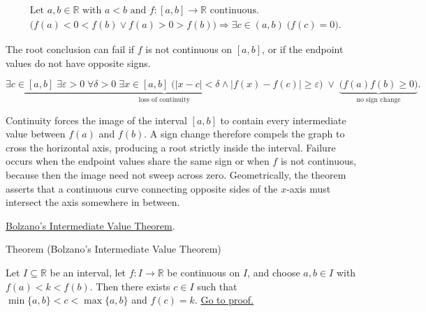 \begin{remark*}
\[
\begin{aligned}
&\text{Let } a,b \in \mathbb{R} \text{ with } a<b \text{ and } f:[a,b]\to\mathbb{R} \text{ continuous.}\\
&\bigl(f(a)<0<f(b) \lor f(a)>0>f(b)\bigr) \Rightarrow \exists c \in (a,b)\; \bigl(f(c)=0\bigr).
\end{aligned}
\]
\end{remark*}

\begin{remark*}
The root conclusion can fail if $f$ is not continuous on $[a,b]$, or if
the endpoint values do not have opposite signs.
\end{remark*}

\begin{remark*}
\[
\underbrace{\exists c\in[a,b]\;\exists \varepsilon>0\;\forall \delta>0\;\exists x\in[a,b]\;
\bigl(|x-c|<\delta\land |f(x)-f(c)|\ge\varepsilon\bigr)}_{\text{loss of continuity}}
\;\lor\;
\underbrace{\bigl(f(a)f(b)\ge 0\bigr)}_{\text{no sign change}}.
\]
\end{remark*}

\begin{remark*}[Interpretation]
Continuity forces the image of the interval $[a,b]$ to contain every intermediate value between $f(a)$ and $f(b)$. A sign change therefore compels the graph to cross the horizontal axis, producing a root strictly inside the interval. Failure occurs when the endpoint values share the same sign or when $f$ is not continuous, because then the image need not sweep across zero. Geometrically, the theorem asserts that a continuous curve connecting opposite sides of the $x$-axis must intersect the axis somewhere in between.
\end{remark*}

\begin{remark*}[Dependencies]
\hyperref[thm:bolzano-intermediate-value]{Bolzano's Intermediate Value Theorem}.
\end{remark*}


\begin{theorembox}{Theorem (Bolzano's Intermediate Value Theorem)}
\begin{theorem}
\label{thm:bolzano-intermediate-value}
Let $I \subseteq \mathbb{R}$ be an interval, let $f \colon I \to \mathbb{R}$ be continuous on $I$, and choose $a,b \in I$ with $f(a) < k < f(b)$. Then there exists $c \in I$ such that $\min\{a,b\} < c < \max\{a,b\}$ and $f(c) = k$. \hyperref[prf:bolzano-intermediate-value]{Go to proof.}
\end{theorem}
\end{theorembox}

